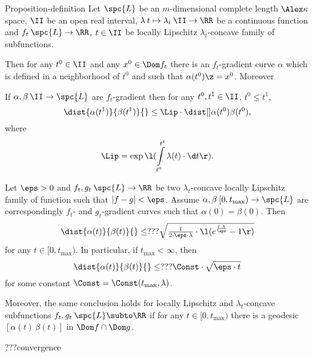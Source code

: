 \begin{thm}{Proposition-definition}\label{prop-def}
Let $\spc{L}$ be an $m$-dimensional complete length $\Alex\kappa$ space,
$\II$ be an open real interval, 
$\lambda\:t\mapsto\lambda_t\:\II\to\RR$ be a continuous function and 
$f_t\:\spc{L}\to \RR$, $t\in \II$ be locally Lipschitz $\lambda_t$-concave family of subfunctions.

Then for any $t^0\in\II$ and any $x^0\in \Dom f_t$ there is an $f_t$-gradient curve $\alpha$ which is defined in a neighborhood of $t^0$ and such that $\alpha(t^0)\z=x^0$.
Moreover
\begin{subthm}{}
If $\alpha,\beta\:\II\to \spc{L}$ are $f_t$-gradient then for any $t^0,t^1\in\II$, $t^0\le t^1$,
\[\dist{\alpha(t^1)}{\beta(t^1)}{}\le \Lip\cdot\dist[{{}}]{\alpha(t^0)}{\beta(t^0)}{},\]
where 
\[\Lip=\exp\l(\int\limits_{t^0}^{t^1}\lambda(t)\cdot\d t\r).\]
\end{subthm}

\begin{subthm}{}
Let $\eps>0$ 
and $f_t,g_t\:\spc{L}\to \RR$ be two $\lambda_t$-concave locally Lipschitz family of function such that $|f-g|<\eps$.
Assume
$\alpha,\beta\:[0,t_{\max})\to \spc{L}$ are correspondingly $f_t$- and $g_t$-gradient curves such that $\alpha(0)=\beta(0)$.
Then 
\[\dist{\alpha(t)}{\beta(t)}{}
\le ???
\sqrt{\tfrac{1}{2\cdot\eps\cdot\lambda}
\cdot
\l(e^{\frac{t\cdot\lambda}\eps}-1\r)}\]
for any $t\in[0,t_{\max})$.
In particular, if $t_{\max}<\infty$, then
\[\dist{\alpha(t)}{\beta(t)}{}
\le
???\Const\cdot\sqrt{\eps\cdot t}\]
for some constant $\Const=\Const(t_{\max},\lambda)$.

Moreover, the same conclusion holds for locally Lipschitz and $\lambda_t$-concave subfunctions $f_t,g_t\:\spc{L}\subto \RR$ if for any $t\in[0,t_{\max})$ there is a geodesic $[\alpha(t)\,\beta(t)]$ in $\Dom f\cap\Dom g$.
\end{subthm}

\begin{subthm}{}
???convergence
\end{subthm}



\end{thm}






















